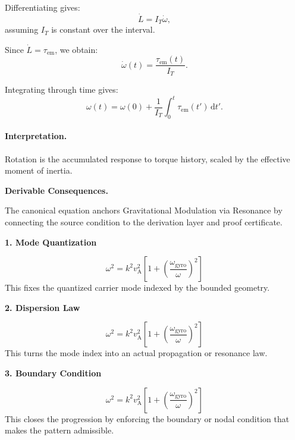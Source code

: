 Differentiating gives:
\begin{equation}
\dot{L}
=
I_T\dot{\omega},
\end{equation}
assuming $I_T$ is constant over the interval.

Since $\dot{L}=\tau_{\mathrm{em}}$, we obtain:
\begin{equation}
\dot{\omega}(t)
=
\frac{\tau_{\mathrm{em}}(t)}{I_T}.
\end{equation}

Integrating through time gives:
\begin{equation}
\boxed{
\omega(t)
=
\omega(0)
+
\frac{1}{I_T}
\int_0^t
\tau_{\mathrm{em}}(t')
\,\mathrm{d}t' .
}
\end{equation}

\paragraph{Interpretation.}
Rotation is the accumulated response to torque history, scaled by the effective moment of inertia.

\par\vspace{0.35em}
\noindent\textbf{Derivable Consequences.}\quad
\begingroup
\footnotesize
\raggedright
The canonical equation anchors Gravitational Modulation via Resonance by connecting the source condition to the derivation layer and proof certificate.
\par\endgroup

\noindent\textbf{1. Mode Quantization}\par
\[
\omega^{2} = k^{2} v_{\mathrm{A}}^{2}\left[1 + \left(\frac{\omega_{\mathrm{gyro}}}{\omega}\right)^{2}\right]
\]
\noindent This fixes the quantized carrier mode indexed by the bounded geometry.\par
\noindent\textbf{2. Dispersion Law}\par
\[
\omega^{2} = k^{2} v_{\mathrm{A}}^{2}\left[1 + \left(\frac{\omega_{\mathrm{gyro}}}{\omega}\right)^{2}\right]
\]
\noindent This turns the mode index into an actual propagation or resonance law.\par
\noindent\textbf{3. Boundary Condition}\par
\[
\omega^{2} = k^{2} v_{\mathrm{A}}^{2}\left[1 + \left(\frac{\omega_{\mathrm{gyro}}}{\omega}\right)^{2}\right]
\]
\noindent This closes the progression by enforcing the boundary or nodal condition that makes the pattern admissible.\par

